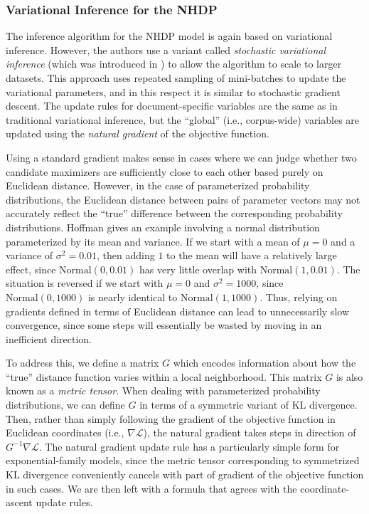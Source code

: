 \documentclass{article}
\begin{document}
\subsubsection{Variational Inference for the NHDP}

The inference algorithm for the NHDP model is again based on variational inference.
However, the authors use a variant called \emph{stochastic variational inference} (which was introduced in \cite{hoffman2013stochastic}) to allow the algorithm to scale to larger datasets.
This approach uses repeated sampling of mini-batches to update the variational parameters, and in this respect it is similar to stochastic gradient descent.
The update rules for document-specific variables are the same as in traditional variational inference, but the ``global'' (i.e., corpus-wide) variables are updated using the \emph{natural gradient} of the objective function.

Using a standard gradient makes sense in cases where we can judge whether two candidate maximizers are sufficiently close to each other based purely on Euclidean distance.
However, in the case of parameterized probability distributions, the Euclidean distance between pairs of parameter vectors may not accurately reflect the ``true'' difference between the corresponding probability distributions.
Hoffman \cite{hoffman2013stochastic} gives an example involving a normal distribution parameterized by its mean and variance.
If we start with a mean of $\mu = 0$ and a variance of $\sigma^2 = 0.01$, then adding $1$ to the mean will have a relatively large effect, since $\mathrm{Normal}(0, 0.01)$ has very little overlap with $\mathrm{Normal}(1, 0.01)$.
The situation is reversed if we start with $\mu = 0$ and $\sigma^2 = 1000$, since $\mathrm{Normal}(0, 1000)$ is nearly identical to $\mathrm{Normal}(1, 1000)$.
Thus, relying on gradients defined in terms of Euclidean distance can lead to unnecessarily slow convergence, since some steps will essentially be wasted by moving in an inefficient direction.

To address this, we define a matrix $G$ which encodes information about how the ``true'' distance function varies within a local neighborhood.
This matrix $G$ is also known as a \emph{metric tensor}.
When dealing with parameterized probability distributions, we can define $G$ in terms of a symmetric variant of KL divergence.
Then, rather than simply following the gradient of the objective function in Euclidean coordinates (i.e., $\nabla \mathcal L$), the natural gradient takes steps in direction of $G^{-1} \nabla \mathcal L$.
The natural gradient update rule has a particularly simple form for exponential-family models, since the metric tensor corresponding to symmetrized KL divergence conveniently cancels with part of gradient of the objective function in such cases.
We are then left with a formula that agrees with the coordinate-ascent update rules.
\end{document}
